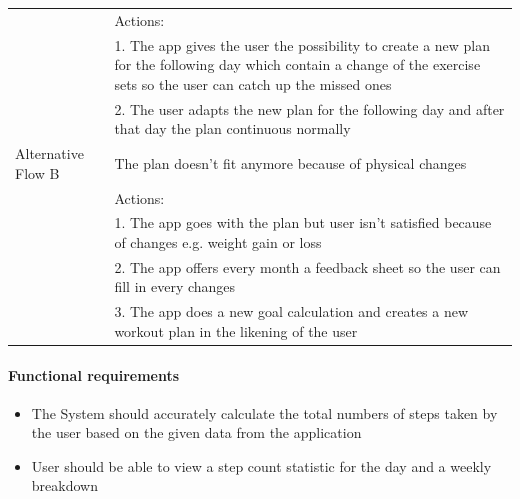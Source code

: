 \documentclass{article}
\begin{document}
\begin{table}[htbp]
\begin{tabularx}{\textwidth}{|>{\raggedright\arraybackslash}p{}|X|}
								 & Actions: \\
								 & 1. The app gives the user the possibility to create a new plan for the following day which contain a change of the exercise sets so the user can catch up the missed ones \\
								 & 2. The user adapts the new plan for the following day and after that day the plan continuous normally \\ \hline
				Alternative Flow B & The plan doesn't fit anymore because of physical changes \\
								 & Actions: \\
								 & 1. The app goes with the plan but user isn't satisfied because of changes e.g. weight gain or loss \\
								 & 2. The app offers every month a feedback sheet so the user can fill in every changes \\
								 & 3. The app does a new goal calculation and creates a new workout plan in the likening of the user \\ \hline
			\end{tabularx}
		\end{table}
		\paragraph{Functional requirements}
		\begin{itemize}
			\item The System should accurately calculate the total numbers of steps taken by the user based on the given data from the application
			\item User should be able to view a step count statistic for the day and a weekly breakdown		
		\end{itemize}
		
\end{document}
